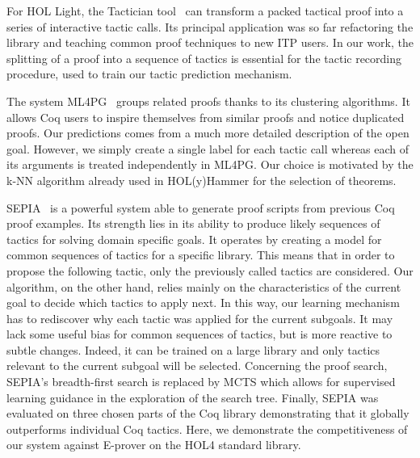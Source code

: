 \documentclass[runningheads,a4paper,draft]{svjour3}
\def\holfour{\textsf{HOL4}\xspace}
\def\hollight{\textsf{HOL Light}\xspace}
\def\coq{\textsf{Coq}\xspace}
\def\eprover{\textsf{E-prover}\xspace}
\def\holyhammer{\textsf{HOL(y)Hammer}\xspace}
\begin{document}
For \hollight, the Tactician tool~\cite{DBLP:conf/sefm/Adams15} 
can transform a packed tactical proof into a series of interactive tactic 
calls. Its principal application 
was so far refactoring the library and teaching common proof techniques to new 
ITP users. In our work, the splitting of a proof into a sequence of tactics is 
essential for the
tactic recording procedure, used to train our tactic prediction mechanism.

The system 
\textsf{ML4PG}~\cite{DBLP:journals/corr/abs-1212-3618,DBLP:journals/mics/HerasK14}
groups related proofs thanks to its clustering 
algorithms. It allows \coq users to inspire themselves from similar proofs and 
notice 
duplicated proofs. Our predictions comes from a much more detailed description 
of the open goal.
However, we simply create a single label for each tactic call whereas each of 
its
arguments is treated independently in \textsf{ML4PG}. 
Our choice is motivated by the k-NN algorithm already used in
\holyhammer for the selection of theorems.

\textsf{SEPIA}~\cite{DBLP:conf/cade/GransdenWR15} is a powerful system able to 
generate
proof scripts from previous \coq proof examples.
Its strength lies in its ability to produce likely sequences 
of tactics for solving domain specific goals. It operates by creating a model 
for common sequences of tactics for a specific library.
This means that in order to propose the following tactic, only the previously 
called tactics
are considered.
Our algorithm, on the other hand, relies mainly on the characteristics of the 
current goal 
to decide
which tactics to apply next. In this way, our learning mechanism has to 
rediscover why each 
tactic was applied for the current subgoals. It may lack some useful bias for 
common sequences 
of tactics, but is more reactive to subtle changes. Indeed, it can be trained 
on a large library and only tactics relevant to the current subgoal will be 
selected. 
Concerning the proof search, \textsf{SEPIA}'s %
breadth-first search is replaced by MCTS which allows for supervised learning
guidance in the exploration of the search tree.
Finally, \textsf{SEPIA} was evaluated on three chosen parts of the 
\coq library demonstrating that it globally outperforms individual \coq 
tactics. Here, we demonstrate the competitiveness of our system against 
\eprover on the \holfour standard library.
\end{document}
